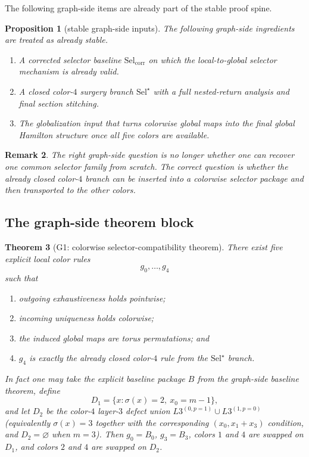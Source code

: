 \documentclass[11pt]{article}
\newtheorem{theorem}{Theorem}[section]
\newtheorem{proposition}[theorem]{Proposition}
\newtheorem{remark}[theorem]{Remark}
\newcommand{\SelCorr}{\mathrm{Sel}_{\mathrm{corr}}}
\newcommand{\SelStar}{\mathrm{Sel}^{\star}}
\begin{document}
The following graph-side items are already part of the stable proof spine.

\begin{proposition}[stable graph-side inputs]
\label{prop:stable-graph-side}
The following graph-side ingredients are treated as already stable.
\begin{enumerate}[label=\textup{(\arabic*)},leftmargin=2.8em]
\item A corrected selector baseline \(\SelCorr\) on which the local-to-global
      selector mechanism is already valid.
\item A closed color-$4$ surgery branch \(\SelStar\) with a full nested-return
      analysis and final section stitching.
\item The globalization input that turns colorwise global maps into the final
      global Hamilton structure once all five colors are available.
\end{enumerate}
\end{proposition}

\begin{remark}
The right graph-side question is no longer whether one can recover one common
selector family from scratch.
The correct question is whether the already closed color-$4$ branch can be
inserted into a colorwise selector package and then transported to the other
colors.
\end{remark}

\subsection{The graph-side theorem block}

\begin{theorem}[G1: colorwise selector-compatibility theorem]
\label{fr:G1}
There exist five explicit local color rules
\[
g_0,\dots,g_4
\]
such that
\begin{enumerate}[label=\textup{(\arabic*)},leftmargin=2.8em]
\item outgoing exhaustiveness holds pointwise;
\item incoming uniqueness holds colorwise;
\item the induced global maps are torus permutations; and
\item \(g_4\) is exactly the already closed color-$4$ rule from the
      \(\SelStar\) branch.
\end{enumerate}
In fact one may take the explicit baseline package \(B\) from the graph-side
baseline theorem, define
\[
D_1=\{x:\sigma(x)=2,\ x_0=m-1\},
\]
and let \(D_2\) be the color-$4$ layer-$3$ defect union
\(L3^{(0,p=1)}\cup L3^{(1,p=0)}\) (equivalently
\(\sigma(x)=3\) together with the corresponding \((x_0,x_1+x_3)\) condition,
and \(D_2=\varnothing\) when \(m=3\)).
Then \(g_0=B_0\), \(g_3=B_3\), colors \(1\) and \(4\) are swapped on \(D_1\),
and colors \(2\) and \(4\) are swapped on \(D_2\).
\end{theorem}
\end{document}
